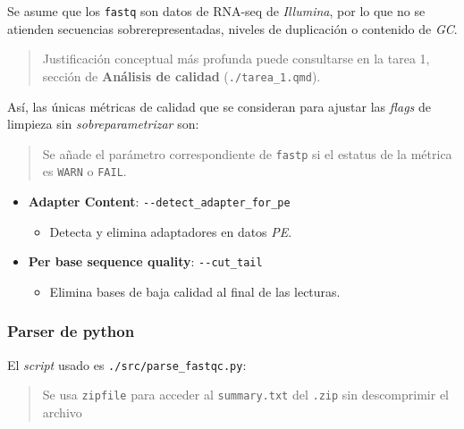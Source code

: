 \documentclass[
  letterpaper,
  DIV=11,
  numbers=noendperiod]{scrartcl}
\providecommand{\tightlist}{%
  \setlength{\itemsep}{0pt}\setlength{\parskip}{0pt}}
\begin{document}
Se asume que los \texttt{fastq} son datos de RNA-seq de \emph{Illumina},
por lo que no se atienden secuencias sobrerepresentadas, niveles de
duplicación o contenido de \emph{GC}.

\begin{quote}
Justificación conceptual más profunda puede consultarse en la tarea 1,
sección de \textbf{Análisis de calidad} (\texttt{./tarea\_1.qmd}).
\end{quote}

Así, las únicas métricas de calidad que se consideran para ajustar las
\emph{flags} de limpieza sin \emph{sobreparametrizar} son:

\begin{quote}
Se añade el parámetro correspondiente de \texttt{fastp} si el estatus de
la métrica es \texttt{WARN} o \texttt{FAIL}.
\end{quote}

\begin{itemize}
\tightlist
\item
  \textbf{Adapter Content}: \texttt{-\/-detect\_adapter\_for\_pe}

  \begin{itemize}
  \tightlist
  \item
    Detecta y elimina adaptadores en datos \emph{PE}.
  \end{itemize}
\item
  \textbf{Per base sequence quality}: \texttt{-\/-cut\_tail}

  \begin{itemize}
  \tightlist
  \item
    Elimina bases de baja calidad al final de las lecturas.
  \end{itemize}
\end{itemize}

\subsubsection{Parser de python}\label{parser-de-python}

El \emph{script} usado es \texttt{./src/parse\_fastqc.py}:

\begin{quote}
Se usa \texttt{zipfile} para acceder al \texttt{summary.txt} del
\texttt{.zip} sin descomprimir el archivo
\end{quote}
\end{document}
